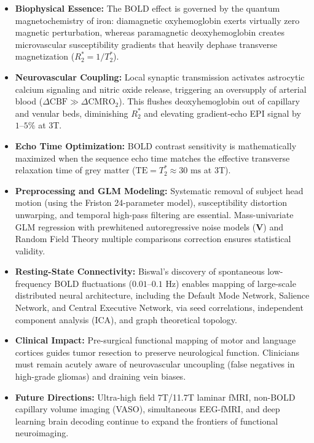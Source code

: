 \documentclass[11pt,a4paper]{article}
\begin{document}
\begin{itemize}[leftmargin=2em]
    \item \textbf{Biophysical Essence:} The BOLD effect is governed by the quantum magnetochemistry of iron: diamagnetic oxyhemoglobin exerts virtually zero magnetic perturbation, whereas paramagnetic deoxyhemoglobin creates microvascular susceptibility gradients that heavily dephase transverse magnetization ($R_2^* = 1/T_2^*$).
    \item \textbf{Neurovascular Coupling:} Local synaptic transmission activates astrocytic calcium signaling and nitric oxide release, triggering an oversupply of arterial blood ($\Delta \text{CBF} \gg \Delta \text{CMRO}_2$). This flushes deoxyhemoglobin out of capillary and venular beds, diminishing $R_2^*$ and elevating gradient-echo EPI signal by $1\text{--}5\%$ at 3T.
    \item \textbf{Echo Time Optimization:} BOLD contrast sensitivity is mathematically maximized when the sequence echo time matches the effective transverse relaxation time of grey matter ($\text{TE} = T_2^* \approx 30\text{ ms}$ at 3T).
    \item \textbf{Preprocessing and GLM Modeling:} Systematic removal of subject head motion (using the Friston 24-parameter model), susceptibility distortion unwarping, and temporal high-pass filtering are essential. Mass-univariate GLM regression with prewhitened autoregressive noise models ($\mathbf{V}$) and Random Field Theory multiple comparisons correction ensures statistical validity.
    \item \textbf{Resting-State Connectivity:} Biswal's discovery of spontaneous low-frequency BOLD fluctuations ($0.01\text{--}0.1\text{ Hz}$) enables mapping of large-scale distributed neural architecture, including the Default Mode Network, Salience Network, and Central Executive Network, via seed correlations, independent component analysis (ICA), and graph theoretical topology.
    \item \textbf{Clinical Impact:} Pre-surgical functional mapping of motor and language cortices guides tumor resection to preserve neurological function. Clinicians must remain acutely aware of neurovascular uncoupling (false negatives in high-grade gliomas) and draining vein biases.
    \item \textbf{Future Directions:} Ultra-high field 7T/11.7T laminar fMRI, non-BOLD capillary volume imaging (VASO), simultaneous EEG-fMRI, and deep learning brain decoding continue to expand the frontiers of functional neuroimaging.
\end{itemize}
\end{document}
